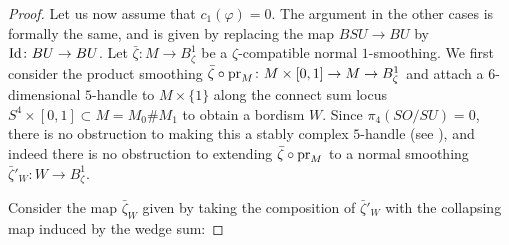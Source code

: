 \documentclass[12pt]{amsart}
\newcommand\acs{\varphi}  				%
\newcommand\scxs{\zeta}					%
\newcommand\bscxs{\bar \zeta}			%
\theoremstyle{remark}
\newcommand{\jbcomm}[1]{\begingroup\color{green}JB:~#1\endgroup}
\begin{document}
\begin{proof}
Let us now assume that $c_1(\acs) = 0$.
The argument in the other cases is formally the same, and is given by replacing
the map $BSU \to BU$ by ${\rm Id} \colon BU \to BU$. %
Let $\bscxs \colon M \to B^1_\scxs$ be a $\scxs$-compatible normal $1$-smoothing.
We first consider the product smoothing 
$\bscxs \circ {\rm pr}_M \colon M \times [0, 1] \to M \to B^1_\scxs$ and attach
a 6-dimensional $5$-handle to $M \times \{1\}$ along the connect sum locus
$S^4 \times [0, 1] \subset M = M_0 \# M_1$ to obtain a bordism $W$.  
Since $\pi_4(SO/SU) = 0$, there is
no obstruction to making this a stably complex $5$-handle (see \cite[Section 2.3]{BCS2}),
and indeed there is no obstruction to extending $\bscxs \circ {\rm pr}_M$ to a normal smoothing
$\bscxs'_{W} \colon W \to B^1_\scxs$.
\begin{comment}
\jbcomm{OPTION 1:} Now let ${\rm col}_0 \colon K_0 \vee K_1 \to K_1$ denote  the map which collapses $K_0$
to a point, and consider the map
%
\[ \bscxs_{W} : = ({\rm Id}_{BSU} \times {\rm col}_0) \circ \bscxs'_{W} \colon 
W_0 \longrightarrow BSU \times (K_0 \vee K_1) \longrightarrow BSU \times K_1.\]
%
This is a normal map, and setting $\bscxs_i := \bscxs_{W}|_{M_i} \colon M_i \to BSU \times K_1$,
$(W, \bscxs_W)$ gives the equation
%
\[ [M, {\rm col}_0 \circ \bscxs] = [M_0, \bscxs_0] + [M, \bscxs_1] \in \Omega_5^{SU}(K_1).\]
%
Now, by Theorem \ref{thm:stein}, $[M, \bscxs] = 0$ since $(M, \acs)$ is Stein fillable, and
so $[M, {\rm col}_0, \circ \bscxs] = 0$.  Moreover, 
the composition ${\rm pr}_{K_1} \circ \bscxs_0 \colon M_0 \to K_1$ is null-homotopic,
and since $\Omega^{SU}_5 = 0$ (\cite[p.\,248]{Stong1}), it follows that $[M_0, \bscxs_0] = 0$. 
Hence $[M_1, \bscxs_1] = 0$, but $\bscxs_1 \colon M_1 \to BSU \times K_1$ is a 
$\scxs_1$-compatible normal $1$-smoothing.  Applying Theorem \ref{thm:stein} again,
we conclude that $(M_1, \acs_1)$ is Stein fillable.
%



\jbcomm{OPTION 2:} 
\end{comment}
Consider the map $\bscxs_W$ given by taking the composition
of $\bscxs'_{W}$ with the collapsing map induced by the
wedge sum:


\end{proof}
\end{document}
